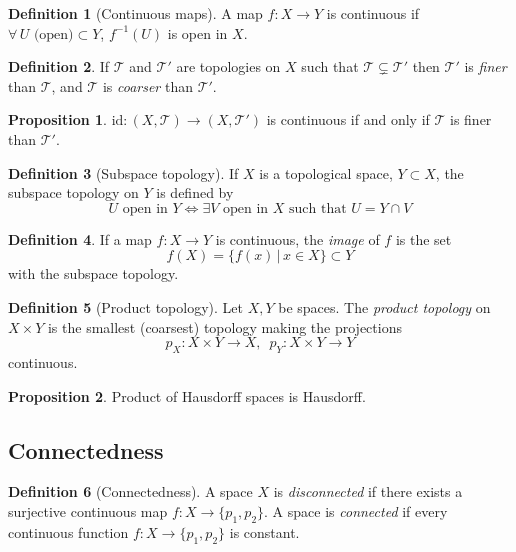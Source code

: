 \documentclass[a4paper,14pt]{extarticle}
\theoremstyle{definition}
\newtheorem*{definition}{Definition}
\newtheorem*{proposition}{Proposition}
\begin{document}
\begin{definition}[Continuous maps]
  A map $f:X\rightarrow Y$ is continuous if $\forall \,U\text{ (open)}\subset Y$,
  $f^{-1}(U)$ is open in $X$.
\end{definition}

\begin{definition}
  If $\mathcal{T}$ and $\mathcal{T}'$ are topologies on $X$ such that $\mathcal{T}\subsetneq\mathcal{T}'$ then $\mathcal{T}'$ is \emph{finer} than $\mathcal{T}$, and 
  $\mathcal{T}$ is \emph{coarser} than $\mathcal{T}'$.
\end{definition}

\begin{proposition}
  $\text{id}:(X,\mathcal{T})\rightarrow (X,\mathcal{T}')$ is continuous if and only if 
  $\mathcal{T}$ is finer than $\mathcal{T}'$.
\end{proposition}

\begin{definition}[Subspace topology]
  If $X$ is a topological space, $Y\subset X$, the subspace topology on $Y$ is defined by
  \[U\text{ open in } Y\iff \exists V\text{ open in }X \text{ such that }U=Y\cap V\]
\end{definition}

\begin{definition}
  If a map $f:X\rightarrow Y$ is continuous, the \emph{image} of $f$ is the set 
  \[f(X)=\{f(x)\,|\,x\in X\}\subset Y\] with the subspace topology.
\end{definition}

\begin{definition}[Product topology]
  Let $X, Y$ be spaces. The \emph{product topology} on $X\times Y$ is the smallest (coarsest)
  topology making the projections
  \[p_X:X\times Y\rightarrow X, \,\,\,p_Y:X\times Y\rightarrow Y\]
  continuous.
\end{definition}

\begin{proposition}
  Product of Hausdorff spaces is Hausdorff.
\end{proposition}

\subsection{Connectedness}
\begin{definition}[Connectedness]
  A space $X$ is \emph{disconnected} if there exists a surjective continuous map 
  $f:X\rightarrow\{p_1,p_2\}$. A space is \emph{connected} if every continuous function
  $f:X\rightarrow\{p_1,p_2\}$ is constant.
\end{definition}
\end{document}
